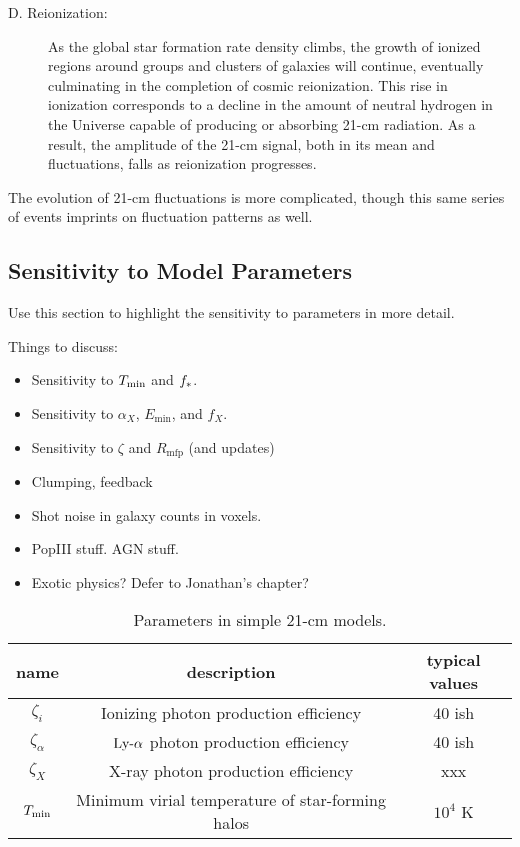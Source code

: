 \begin{description}
	\item[D. Reionization:] As the global star formation rate density climbs, the growth of ionized regions around groups and clusters of galaxies will continue, eventually culminating in the completion of cosmic reionization. This rise in ionization corresponds to a decline in the amount of neutral hydrogen in the Universe capable of producing or absorbing 21-cm radiation. As a result, the amplitude of the 21-cm signal, both in its mean and fluctuations, falls as reionization progresses.
\end{description}


The evolution of 21-cm fluctuations is more complicated, though this same series of events imprints on fluctuation patterns as well. 


\subsection{Sensitivity to Model Parameters}
Use this section to highlight the sensitivity to parameters in more detail.


Things to discuss:
\begin{itemize}
	\item Sensitivity to $T_{\min}$ and $f_{\ast}$.
	\item Sensitivity to $\alpha_X$, $E_{\min}$, and $f_X$.
	\item Sensitivity to $\zeta$ and $R_{\mathrm{mfp}}$ (and updates)
	\item Clumping, feedback
	\item Shot noise in galaxy counts in voxels.
	\item PopIII stuff. AGN stuff.
	\item Exotic physics? Defer to Jonathan's chapter?
\end{itemize}

\begin{center}
\begin{table}
\begin{tabular}{||c | c | c||}
\hline
name & description & typical values \\ 
\hline\hline
$\zeta_i$ & Ionizing photon production efficiency & 40 ish  \\ 
\hline
$\zeta_{\alpha}$ & $\text{Ly-}\alpha$ photon production efficiency & 40 ish  \\ 
\hline
$\zeta_X$ & X-ray photon production efficiency & xxx \\
\hline
$T_{\min}$ & Minimum virial temperature of star-forming halos & $10^4$ K \\
\hline
\end{tabular}
\caption{Parameters in simple 21-cm models.}
\end{table}
\end{center}



